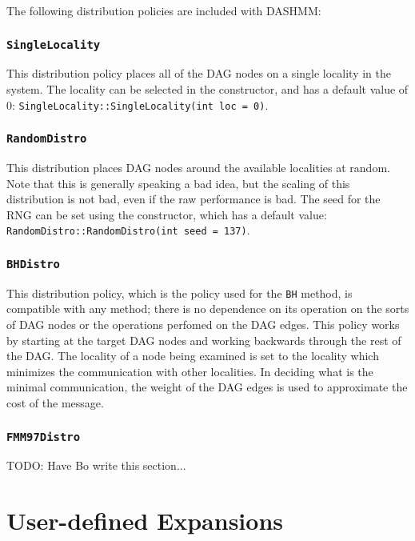 The following distribution policies are included with DASHMM:

\subsubsection{\texttt{SingleLocality}}

This distribution policy places all of the DAG nodes on a single locality in
the system. The locality can be selected in the constructor, and has a default
value of 0: \texttt{SingleLocality::SingleLocality(int loc = 0)}.

\subsubsection{\texttt{RandomDistro}}

This distribution places DAG nodes around the available localities at random.
Note that this is generally speaking a bad idea, but the scaling of this
distribution is not bad, even if the raw performance is bad. The seed for the
RNG can be set using the constructor, which has a default value:
\texttt{RandomDistro::RandomDistro(int seed = 137)}.

\subsubsection{\texttt{BHDistro}}

This distribution policy, which is the policy used for the \texttt{BH} method,
is compatible with any method; there is no dependence on its operation on the
sorts of DAG nodes or the operations perfomed on the DAG edges. This policy
works by starting at the target DAG nodes and working backwards through the
rest of the DAG. The locality of a node being examined is set to the locality
which minimizes the communication with other localities. In deciding what is
the minimal communication, the weight of the DAG edges is used to approximate
the cost of the message.

\subsubsection{\texttt{FMM97Distro}}

TODO: Have Bo write this section...



\section{User-defined Expansions}

